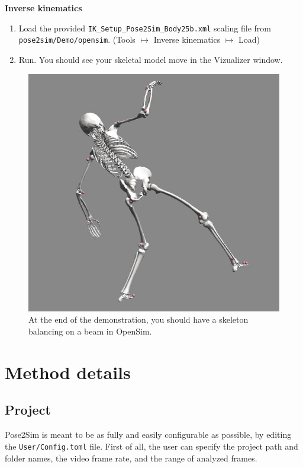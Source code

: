 \textbf{Inverse kinematics}
\begin{enumerate}[itemsep=0em, topsep=0em, leftmargin=*]
    \item Load the provided \texttt{IK_Setup_Pose2Sim_Body25b.xml} scaling file from \texttt{pose2sim/Demo/opensim}. (Tools $\mapsto$ Inverse kinematics $\mapsto$ Load)
    \item Run. You should see your skeletal model move in the Vizualizer window.
\end{enumerate}

\begin{figure}[hbtp]
	\centering
	\def\svgwidth{1\columnwidth}
	\fontsize{10pt}{10pt}\selectfont
	\includegraphics[width=\linewidth]{"../Chap3/Figures/Fig_OpenSimDemo.JPG"}
	\caption{At the end of the demonstration, you should have a skeleton balancing on a beam in OpenSim.}
	\label{fig_opensimdemo}
\end{figure}


\section{Method details}\label{methods_details}

\subsection{Project}
Pose2Sim is meant to be as fully and easily configurable as possible, by editing the \texttt{User/Config.toml} file. First of all, the user can specify the project path and folder names, the video frame rate, and the range of analyzed frames. 


